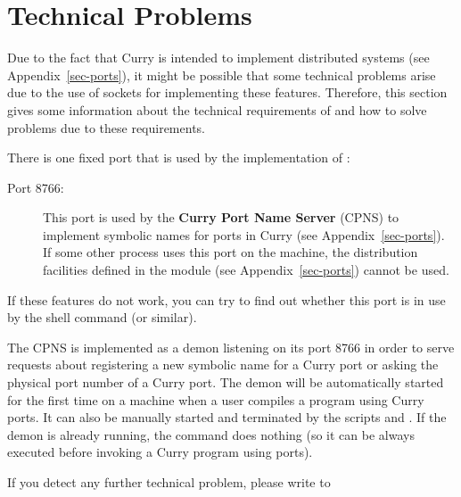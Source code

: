 \section{Technical Problems}

Due to the fact that Curry is intended to implement
distributed systems (see Appendix~\ref{sec-ports}),
it might be possible that some technical problems
arise due to the use of sockets for implementing these
features. Therefore, this section gives some information
about the technical requirements of \CYS and how to solve
problems due to these requirements.

There is one fixed port that is used by the implementation of \CYS:
\begin{description}
\item[Port 8766:] This port is used by the
{\bf Curry Port Name Server} (CPNS) to implement symbolic names for
ports in Curry (see Appendix~\ref{sec-ports}).
If some other process uses this port on the machine,
the distribution facilities defined in the module 
(see Appendix~\ref{sec-ports}) cannot be used.
\end{description}
If these features do not work, you can try to find out
whether this port is in use by the shell command
 (or similar).

The CPNS is implemented as a demon listening on its port 8766
in order to serve requests about registering a new symbolic
name for a Curry port or asking the physical port number
of a Curry port. The demon will be automatically started for
the first time on a machine when a user compiles a program
using Curry ports. It can also be manually started and terminated by the
scripts  and
.
If the demon is already running, the command 
does nothing (so it can be always executed
before invoking a Curry program using ports).

If you detect any further technical problem,
please write to
\begin{center}
\end{center}

